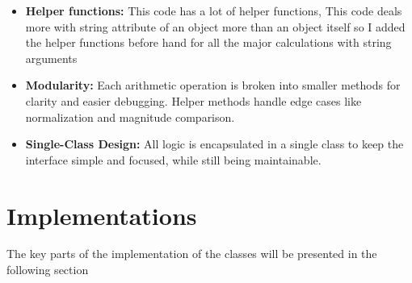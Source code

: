 \documentclass{article}
\begin{document}
\begin{itemize}
    \item \textbf{Helper functions:} This code has a lot of helper functions, This code deals more with string attribute of an object more than an object itself so I added the helper functions before hand for all the major calculations with string arguments 

    \item \textbf{Modularity:} Each arithmetic operation is broken into smaller methods for clarity and easier debugging. Helper methods handle edge cases like normalization and magnitude comparison.

    \item \textbf{Single-Class Design:} All logic is encapsulated in a single class to keep the interface simple and focused, while still being maintainable.
\end{itemize}

\section{Implementations}
The key parts of the implementation of the classes will be presented in the following section
\end{document}
